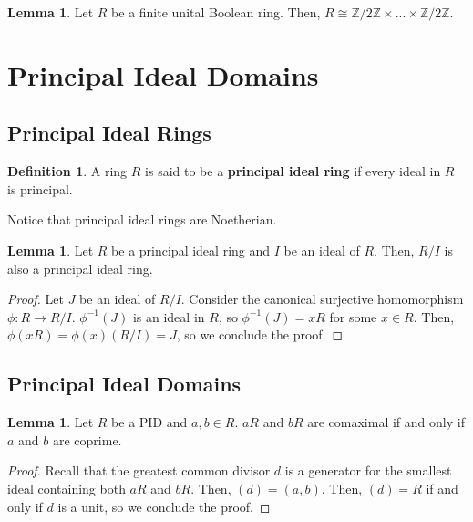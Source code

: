 \documentclass{article}
\theoremstyle{definition}
\newtheorem{definition}{Definition}
\newtheorem{lemma}[theorem]{Lemma}
\newcommand{\Z}{\mathbb{Z}}
\begin{document}
\begin{lemma}
    Let $R$ be a finite unital Boolean ring. Then, $R \cong \Z / 2\Z \times ... \times \Z / 2\Z$.
\end{lemma}

\newpage

\section{Principal Ideal Domains}\label{pids}

\subsection{Principal Ideal Rings}

\begin{definition}
    A ring $R$ is said to be a \textbf{principal ideal ring}
    if every ideal in $R$ is principal.
\end{definition}

Notice that principal ideal rings are Noetherian.

\begin{lemma}
    Let $R$ be a principal ideal ring and $I$ be an ideal of 
    $R$. Then, $R/I$ is also a principal ideal ring.
\end{lemma}
\begin{proof}
    Let $J$ be an ideal of $R/I$. Consider the canonical surjective homomorphism
    $\phi: R \xrightarrow{} R/I$. $\phi^{-1}(J)$ is an ideal in $R$, so 
    $\phi^{-1}(J) = xR$ for some $x \in R$. Then, $\phi(xR) = \phi(x)(R/I) = J$,
    so we conclude the proof.
\end{proof}

\subsection{Principal Ideal Domains}

\begin{lemma}\label{coprime_equals_comaximal_in_pids}
    Let $R$ be a PID and $a,b \in R$.
    $aR$ and $bR$ are comaximal if and only if $a$ and $b$ are coprime.
\end{lemma}
\begin{proof}
    Recall that the greatest common divisor $d$ is a generator for the smallest ideal containing both $aR$ and $bR$. Then, $(d) = (a,b)$. Then, $(d) = R$ if and only if $d$ is a unit, so we conclude the proof.
\end{proof}
\end{document}
